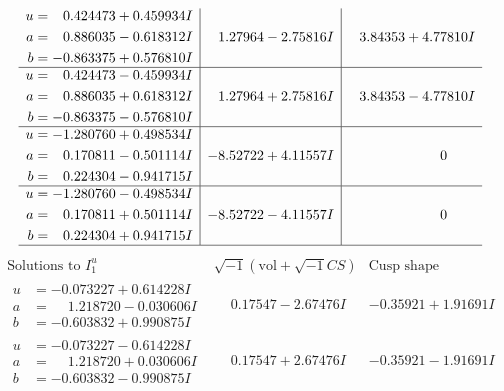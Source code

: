 \documentclass[1p]{elsarticle_modified}
\theoremstyle{definition}
\newcommand{\I}{\sqrt{-1}}
\begin{document}
$$\begin{array}{c|c|c}
\begin{aligned}
u &= \phantom{-}0.424473 + 0.459934 I \\
a &= \phantom{-}0.886035 - 0.618312 I \\
b &= -0.863375 + 0.576810 I\end{aligned}
 & \phantom{-}1.27964 - 2.75816 I & \phantom{-}3.84353 + 4.77810 I \\ \hline\begin{aligned}
u &= \phantom{-}0.424473 - 0.459934 I \\
a &= \phantom{-}0.886035 + 0.618312 I \\
b &= -0.863375 - 0.576810 I\end{aligned}
 & \phantom{-}1.27964 + 2.75816 I & \phantom{-}3.84353 - 4.77810 I \\ \hline\begin{aligned}
u &= -1.280760 + 0.498534 I \\
a &= \phantom{-}0.170811 - 0.501114 I \\
b &= \phantom{-}0.224304 - 0.941715 I\end{aligned}
 & -8.52722 + 4.11557 I & \phantom{-0.000000 } 0 \\ \hline\begin{aligned}
u &= -1.280760 - 0.498534 I \\
a &= \phantom{-}0.170811 + 0.501114 I \\
b &= \phantom{-}0.224304 + 0.941715 I\end{aligned}
 & -8.52722 - 4.11557 I & \phantom{-0.000000 } 0\\
 \hline 
 \end{array}$$\newpage$$\begin{array}{c|c|c}  
\text{Solutions to }I^u_{1}& \I (\text{vol} + \sqrt{-1}CS) & \text{Cusp shape}\\
 \hline 
\begin{aligned}
u &= -0.073227 + 0.614228 I \\
a &= \phantom{-}1.218720 - 0.030606 I \\
b &= -0.603832 + 0.990875 I\end{aligned}
 & \phantom{-}0.17547 - 2.67476 I & -0.35921 + 1.91691 I \\ \hline\begin{aligned}
u &= -0.073227 - 0.614228 I \\
a &= \phantom{-}1.218720 + 0.030606 I \\
b &= -0.603832 - 0.990875 I\end{aligned}
 & \phantom{-}0.17547 + 2.67476 I & -0.35921 - 1.91691 I \\ \hline\begin{aligned}

\end{aligned}
\end{array}$$
\end{document}
